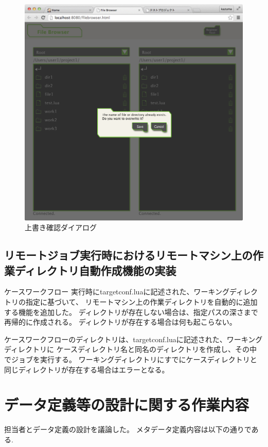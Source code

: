 \documentclass[a4paper,10pt,oneside]{jsbook}
\begin{document}
\begin{figure}[htbp]
	\begin{center}
		\includegraphics[width=12.0cm]{image/confirm_dialog.png}
	\end{center}
	\caption{上書き確認ダイアログ}
	\label{fig:confirm_dialog}
\end{figure}


\section{リモートジョブ実行時におけるリモートマシン上の作業ディレクトリ自動作成機能の実装}
ケースワークフロー	実行時にtargetconf.luaに記述された、ワーキングディレクトリの指定に基づいて、
リモートマシン上の作業ディレクトリを自動的に追加する機能を追加した。
ディレクトリが存在しない場合は、指定パスの深さまで再帰的に作成される。
ディレクトリが存在する場合は何も起こらない。

ケースワークフローのディレクトリは、targetconf.luaに記述された、ワーキングディレクトリに
ケースディレクトリ名と同名のディレクトリを作成し、その中でジョブを実行する。
ワーキングディレクトリにすでにケースディレクトリと同じディレクトリが存在する場合はエラーとなる。


\chapter{データ定義等の設計に関する作業内容}
担当者とデータ定義の設計を議論した。
メタデータ定義内容は以下の通りである.
\end{document}
